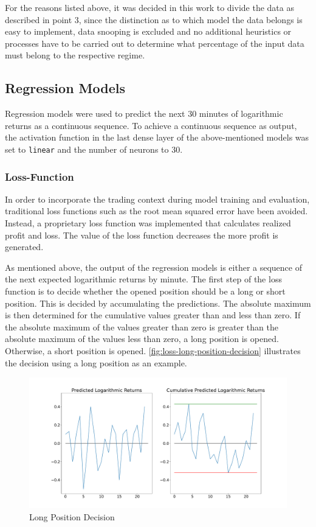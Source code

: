 \noindent
For the reasons listed above, it was decided in this work to divide the data as described in point 3, since the distinction as to which model the data belongs is easy to implement, data snooping is excluded and no additional heuristics or processes have to be carried out to determine what percentage of the input data must belong to the respective regime.

\subsection{Regression Models}
\label{chap:regression-models}

Regression models were used to predict the next 30 minutes of logarithmic returns as a continuous sequence.
To achieve a continuous sequence as output, the activation function in the last dense layer of the above-mentioned models was set to \texttt{linear} \cite{linear-softmax} and the number of neurons to 30.

\subsubsection{Loss-Function}
\label{chap:regression-loss}

In order to incorporate the trading context during model training and evaluation, traditional loss functions such as the root mean squared error have been avoided.
Instead, a proprietary loss function was implemented that calculates realized profit and loss.
The value of the loss function decreases the more profit is generated.

As mentioned above, the output of the regression models is either a sequence of the next expected logarithmic returns by minute.
The first step of the loss function is to decide whether the opened position should be a long or short position.
This is decided by accumulating the predictions.
The absolute maximum is then determined for the cumulative values greater than and less than zero.
If the absolute maximum of the values greater than zero is greater than the absolute maximum of the values less than zero, a long position is opened.
Otherwise, a short position is opened.
\autoref{fig:loss-long-position-decision} illustrates the decision using a long position as an example.

\begin{figure}[H]
    \centering
    \includegraphics[width=\textwidth]{images/models/loss_direction}
    \caption{Long Position Decision}
    \label{fig:loss-long-position-decision}
\end{figure}

